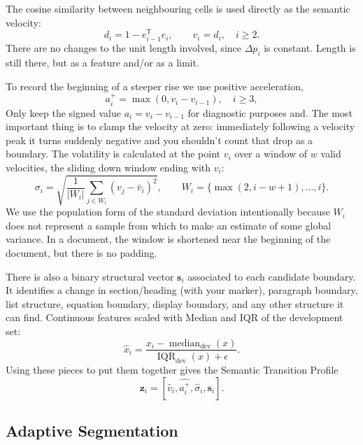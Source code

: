 \documentclass[10pt,a4paper]{article}
\begin{document}
The cosine similarity between neighbouring cells is used directly as the semantic velocity:
\begin{equation}
d_i=1-e_{i-1}^{\mathsf T}e_i,\qquad v_i=d_i,\quad i\geq2.
\label{eq:velocity}
\end{equation}
There are no changes to the unit length involved, since $\Delta p_i$ is constant. Length is still there, but as a feature and/or as a limit.

To record the beginning of a steeper rise we use positive acceleration,
\begin{equation}
a_i^+=\max(0,v_i-v_{i-1}),\quad i\geq3,
\label{eq:acceleration}
\end{equation}
Only keep the signed value $a_i=v_i-v_{i-1}$ for diagnostic purposes and. The most important thing is to clamp the velocity at zero: immediately following a velocity peak it turns suddenly negative and you shouldn't count that drop as a boundary. The volatility is calculated at the point $v_i$ over a window of $w$ valid velocities, the sliding down window ending with $v_i$:
\begin{equation}
\sigma_i=\sqrt{\frac{1}{|W_i|}\sum_{j\in W_i}(v_j-\bar v_i)^2},
\qquad W_i=\{\max(2,i-w+1),\ldots,i\}.
\label{eq:volatility}
\end{equation}
We use the population form of the standard deviation intentionally because $W_i$ does not represent a sample from which to make an estimate of some global variance. In a document, the window is shortened near the beginning of the document, but there is no padding.

There is also a binary structural vector $\mathbf{s}_i$ associated to each candidate boundary. It identifies a change in section/heading (with your marker), paragraph boundary, list structure, equation boundary, display boundary, and any other structure it can find. Continuous features scaled with Median and IQR of the development set:
\begin{equation}
\hat x_i=\frac{x_i-\operatorname{median}_{\mathrm{dev}}(x)}
{\operatorname{IQR}_{\mathrm{dev}}(x)+\epsilon}.
\end{equation}
Using these pieces to put them together gives the Semantic Transition Profile
\begin{equation}
\mathbf{z}_i=[\hat v_i,\widehat{a_i^+},\hat\sigma_i,\mathbf{s}_i].
\label{eq:profile}
\end{equation}

\subsection{Adaptive Segmentation}
\end{document}
